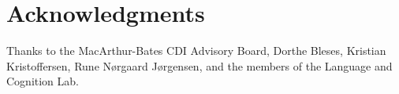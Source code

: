 \documentclass[10pt,letterpaper]{article}
\begin{document}

\section{Acknowledgments}

Thanks to the MacArthur-Bates CDI Advisory Board, Dorthe Bleses, Kristian Kristoffersen, Rune N\o rgaard J\o rgensen, and the members of the Language and Cognition Lab. 



\setlength{\bibleftmargin}{.125in}
\setlength{\bibindent}{-\bibleftmargin}


\end{document}
